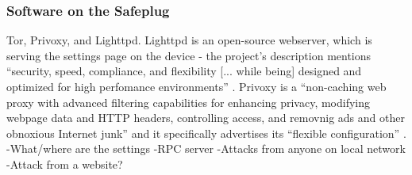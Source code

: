     \subsubsection{Software on the Safeplug}
Tor, Privoxy, and Lighttpd.  Lighttpd is an open-source webserver, which is serving the settings page on the device - the project's description mentions ``security, speed, compliance, and flexibility [... while being] designed and optimized for high perfomance environments'' \cite{lighttpd}.  Privoxy is a ``non-caching web proxy with advanced filtering capabilities for enhancing privacy, modifying webpage data and HTTP headers, controlling access, and removnig ads and other obnoxious Internet junk'' and it specifically advertises its ``flexible configuration'' \cite{privoxy}.
    -What/where are the settings
    -RPC server
        -Attacks from anyone on local network
        -Attack from a website?
